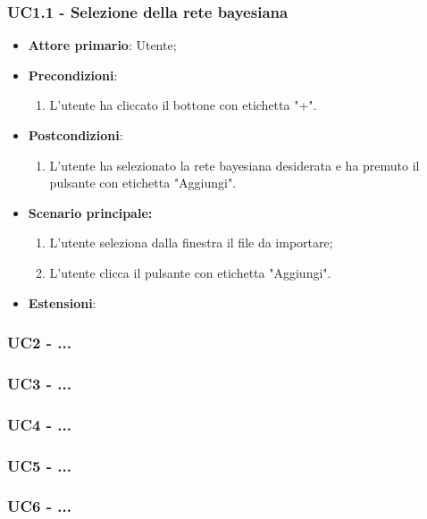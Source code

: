 \subsubsection{UC1.1 - Selezione della rete bayesiana}\label{UC1.1}
\begin{itemize}
	\item \textbf{Attore primario}: Utente;
	\item \textbf{Precondizioni}:
	\begin{enumerate}
		\item L'utente ha cliccato il bottone con etichetta "+".
	\end{enumerate}
	\item \textbf{Postcondizioni}: 
	\begin{enumerate}
		\item L'utente ha selezionato la rete bayesiana desiderata e ha premuto il pulsante con etichetta "Aggiungi".
	\end{enumerate}
	\item \textbf{Scenario principale:}
	\begin{enumerate}
		\item L'utente seleziona dalla finestra il file da importare;
		\item L'utente clicca il pulsante con etichetta "Aggiungi".
	\end{enumerate}
	\item \textbf{Estensioni}:
\end{itemize}

\subsubsection{UC2 - ...}\label{UC2}

\subsubsection{UC3 - ...}\label{UC3}

\subsubsection{UC4 - ...}\label{UC4}

\subsubsection{UC5 - ...}\label{UC5}

\subsubsection{UC6 - ...}\label{UC6}
